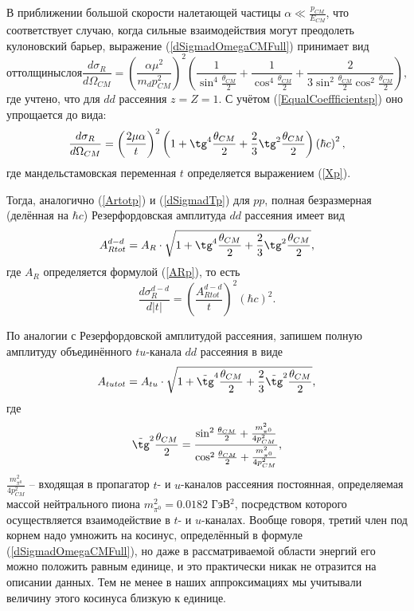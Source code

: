 \documentclass[a4paper,12pt]{article}
\begin{document}
\begin{large}
В приближении большой скорости налетающей частицы $\alpha \ll \frac{p_{CM}}{E_{CM}}$, что соответствует случаю, когда сильные взаимодействия могут преодолеть кулоновский барьер, выражение (\ref{dSigmadOmegaCMFull}) принимает вид
\begin{equation}от толщины слоя
  \label{dSigmadOmegaCM}
  \frac{d\sigma_R}{d\Omega_{CM}}=\left( \frac{\alpha\mu^2}{m_d p_{CM}^2} \right)^2\left( \frac{1}{\sin^4{\frac{\theta_{CM}}{2}}} +  \frac{1}{\cos^4{\frac{\theta_{CM}}{2}}} + \frac{2}{3\sin^2{\frac{\theta_{CM}}{2}}\cos^2{\frac{\theta_{CM}}{2}}} \right),
\end{equation}
где учтено, что для $dd$ рассеяния $z=Z=1$. С учётом (\ref{EqualCoeffficientsp}) оно упрощается до вида:
\begin{equation}
  \label{dSigmadOmegaCMSimple}
  \frac{d\sigma_R}{d\Omega_{CM}}=\left( \frac{2\mu \alpha }{t} \right)^2 \left(  1+\tg^4{\frac{\theta_{CM}}{2}} + \frac{2}{3} \tg^2{\frac{\theta_{CM}}{2}}  \right) \left( \hbar c \right)^2,
\end{equation}
где мандельстамовская переменная $t$ определяется выражением (\ref{Xp}).

Тогда, аналогично (\ref{Artotp}) и (\ref{dSigmadTp}) для $pp$, полная безразмерная (делённая на $\hbar c$) Резерфордовская амплитуда $dd$ рассеяния имеет вид
\begin{equation}
  \label{Ar}
A_{Rtot}^{d-d}=A_R \cdot \sqrt{1+\tg^4{\frac{\theta_{CM}}{2}}+\frac{2}{3} \tg^2\frac{\theta_{CM}}{2}},
\end{equation}
где $A_R$ определяется формулой (\ref{ARp}), то есть 
\begin{equation}
  \label{dSigmaRdx}
\frac{d\sigma_R^{d-d}}{d|t|}=\left( \frac{A_{Rtot}^{d-d}}{t} \right)^2 \left( \hbar c \right)^2.
\end{equation}

По аналогии с Резерфордовской амплитудой рассеяния, запишем полную амплитуду объединённого $tu$-канала $dd$ рассеяния в виде
\begin{equation}
  \label{Atu}
A_{tutot}=A_{tu} \cdot \sqrt{1+\tilde \tg^4{\frac{\theta_{CM}}{2}}+\frac{2}{3} \tilde \tg^2{\frac{\theta_{CM}}{2}}},
\end{equation}
где 
\begin{equation}
  \label{Tg2t}
\tilde\tg^2{\frac{\theta_{CM}}{2}}=\frac{\sin^2{\frac{\theta_{CM}}{2}}+\frac{m_{\pi^0}^2}{4p_{CM}^2}}{\cos^2\frac{\theta_{CM}}{2}+\frac{m_{\pi^0}^2}{4p_{CM}^2}},
\end{equation}
$\frac{m_{\pi^0}^2}{4p_{CM}^2}$ -- входящая в пропагатор $t$- и $u$-каналов рассеяния постоянная, определяемая массой нейтрального пиона $m_{\pi^0}^2=0.0182$ ГэВ$^2$, посредством которого осуществляется взаимодействие в $t$- и $u$-каналах.
  Вообще говоря, третий член под корнем надо умножить на косинус, определённый в формуле (\ref{dSigmadOmegaCMFull}), но даже в рассматриваемой области энергий его можно положить равным единице, и это практически никак не отразится на описании данных.
  Тем не менее в наших аппроксимациях мы учитывали величину этого косинуса близкую к единице.


\end{large}
\end{document}
